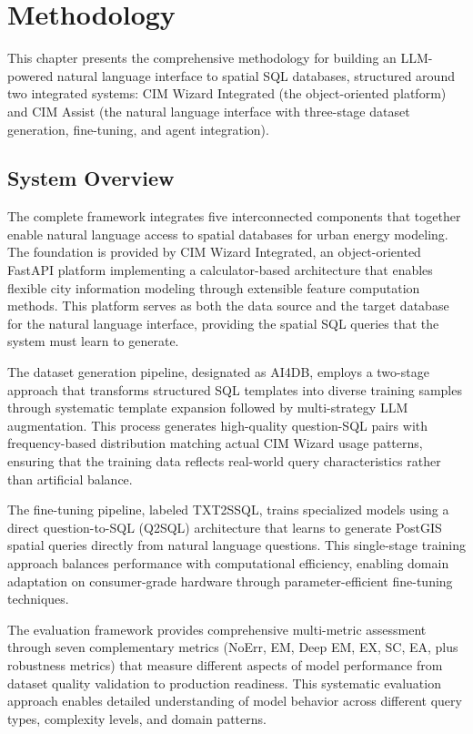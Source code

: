 \chapter{Methodology}
\label{ch:methodology}

This chapter presents the comprehensive methodology for building an LLM-powered natural language interface to spatial SQL databases, structured around two integrated systems: CIM Wizard Integrated (the object-oriented platform) and CIM Assist (the natural language interface with three-stage dataset generation, fine-tuning, and agent integration).

\section{System Overview}

The complete framework integrates five interconnected components that together enable natural language access to spatial databases for urban energy modeling. The foundation is provided by CIM Wizard Integrated, an object-oriented FastAPI platform implementing a calculator-based architecture that enables flexible city information modeling through extensible feature computation methods. This platform serves as both the data source and the target database for the natural language interface, providing the spatial SQL queries that the system must learn to generate.

The dataset generation pipeline, designated as AI4DB, employs a two-stage approach that transforms structured SQL templates into diverse training samples through systematic template expansion followed by multi-strategy LLM augmentation. This process generates high-quality question-SQL pairs with frequency-based distribution matching actual CIM Wizard usage patterns, ensuring that the training data reflects real-world query characteristics rather than artificial balance.

The fine-tuning pipeline, labeled TXT2SSQL, trains specialized models using a direct question-to-SQL (Q2SQL) architecture that learns to generate PostGIS spatial queries directly from natural language questions. This single-stage training approach balances performance with computational efficiency, enabling domain adaptation on consumer-grade hardware through parameter-efficient fine-tuning techniques.

The evaluation framework provides comprehensive multi-metric assessment through seven complementary metrics (NoErr, EM, Deep EM, EX, SC, EA, plus robustness metrics) that measure different aspects of model performance from dataset quality validation to production readiness. This systematic evaluation approach enables detailed understanding of model behavior across different query types, complexity levels, and domain patterns.

